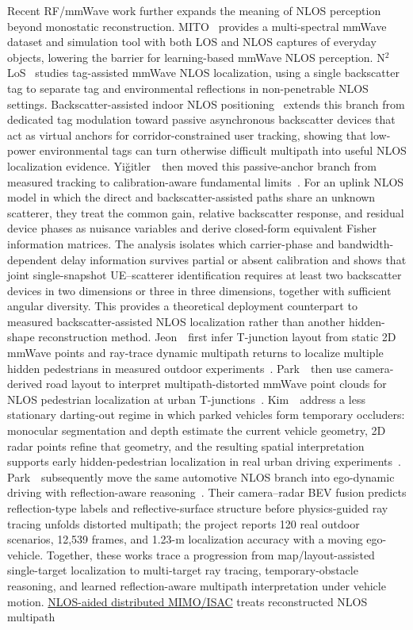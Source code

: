 Recent RF/mmWave work further expands the meaning of NLOS perception beyond monostatic reconstruction. MITO~\cite{doddsMITO2025} provides a multi-spectral mmWave dataset and simulation tool with both LOS and NLOS captures of everyday objects, lowering the barrier for learning-based mmWave NLOS perception. N$^2$LoS~\cite{shiN2LoS2025} studies tag-assisted mmWave NLOS localization, using a single backscatter tag to separate tag and environmental reflections in non-penetrable NLOS settings. Backscatter-assisted indoor NLOS positioning~\cite{ruttikBackscatterNLOS2026} extends this branch from dedicated tag modulation toward passive asynchronous backscatter devices that act as virtual anchors for corridor-constrained user tracking, showing that low-power environmental tags can turn otherwise difficult multipath into useful NLOS localization evidence. Yi\u{g}itler~\etal~then moved this passive-anchor branch from measured tracking to calibration-aware fundamental limits~\cite{yigitlerAmbientIoTBackscatter2026}. For an uplink NLOS model in which the direct and backscatter-assisted paths share an unknown scatterer, they treat the common gain, relative backscatter response, and residual device phases as nuisance variables and derive closed-form equivalent Fisher information matrices. The analysis isolates which carrier-phase and bandwidth-dependent delay information survives partial or absent calibration and shows that joint single-snapshot UE--scatterer identification requires at least two backscatter devices in two dimensions or three in three dimensions, together with sufficient angular diversity. This provides a theoretical deployment counterpart to measured backscatter-assisted NLOS localization rather than another hidden-shape reconstruction method. Jeon~\etal~first infer T-junction layout from static 2D mmWave points and ray-trace dynamic multipath returns to localize multiple hidden pedestrians in measured outdoor experiments~\cite{jeonTJunctionMmWaveNLOS2025}. Park~\etal~then use camera-derived road layout to interpret multipath-distorted mmWave point clouds for NLOS pedestrian localization at urban T-junctions~\cite{parkTjunctionPedestrian2025}. Kim~\etal~address a less stationary darting-out regime in which parked vehicles form temporary occluders: monocular segmentation and depth estimate the current vehicle geometry, 2D radar points refine that geometry, and the resulting spatial interpretation supports early hidden-pedestrian localization in real urban driving experiments~\cite{kimDartingOutNLOS2025}. Park~\etal~subsequently move the same automotive NLOS branch into ego-dynamic driving with reflection-aware reasoning~\cite{parkReflectionAwareNLOS2026}. Their camera--radar BEV fusion predicts reflection-type labels and reflective-surface structure before physics-guided ray tracing unfolds distorted multipath; the project reports 120 real outdoor scenarios, 12,539 frames, and 1.23-m localization accuracy with a moving ego-vehicle. Together, these works trace a progression from map/layout-assisted single-target localization to multi-target ray tracing, temporary-obstacle reasoning, and learned reflection-aware multipath interpretation under vehicle motion. \href{https://arxiv.org/abs/2603.13981}{NLOS-aided distributed MIMO/ISAC} treats reconstructed NLOS multipath 